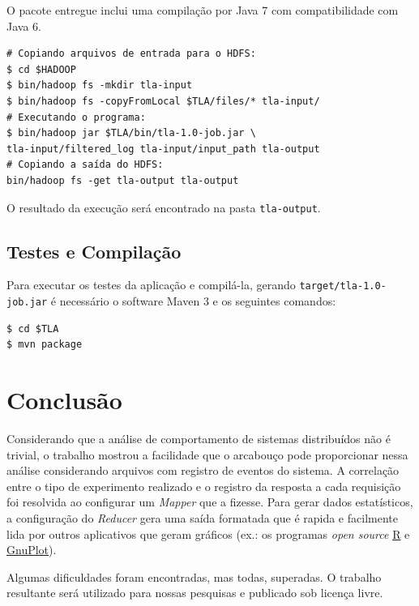 \documentclass[brazil, a4paper,12pt]{article}
\begin{document}
O pacote entregue inclui uma compilação por Java 7 com compatibilidade com Java
6.

\begin{verbatim}
# Copiando arquivos de entrada para o HDFS:
$ cd $HADOOP
$ bin/hadoop fs -mkdir tla-input
$ bin/hadoop fs -copyFromLocal $TLA/files/* tla-input/
# Executando o programa:
$ bin/hadoop jar $TLA/bin/tla-1.0-job.jar \
tla-input/filtered_log tla-input/input_path tla-output
# Copiando a saída do HDFS:
bin/hadoop fs -get tla-output tla-output
\end{verbatim}

O resultado da execução será encontrado na pasta \verb|tla-output|.

\subsection {Testes e Compilação}

Para executar os testes da aplicação e compilá-la, gerando
\verb|target/tla-1.0-job.jar| é necessário o software Maven 3 e os seguintes
comandos:

\begin{verbatim}
$ cd $TLA
$ mvn package
\end{verbatim}

\section {Conclusão}

Considerando que a análise de comportamento de sistemas distribuídos não é
trivial, o trabalho mostrou a facilidade que o arcabouço pode proporcionar
nessa análise considerando arquivos com registro de eventos do sistema. A
correlação entre o tipo de experimento realizado e o registro da resposta a
cada requisição foi resolvida ao configurar um \emph{Mapper} que a fizesse.
Para gerar dados estatísticos, a configuração do \emph{Reducer} gera uma saída
formatada que é rapida e facilmente lida por outros aplicativos que geram
gráficos (ex.: os programas \textit{open source}
    \href{http://www.r-project.org/}{R} e
    \href{http://www.gnuplot.info/}{GnuPlot}).

Algumas dificuldades foram encontradas, mas todas, superadas. O trabalho
resultante será utilizado para nossas pesquisas e publicado sob licença livre.
\end{document}
